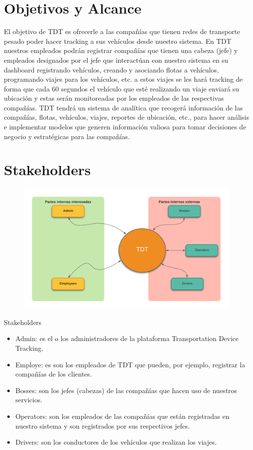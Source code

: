 \documentclass{article}
\begin{document}
\section{Objetivos y Alcance} 
El objetivo de TDT es ofrecerle a las compañías que tienen redes de transporte pesado poder hacer tracking a sus vehículos desde nuestro sistema. En TDT nuestros empleados podrán registrar compañías que tienen una cabeza (jefe) y empleados designados por el jefe que interactúan con nuestro sistema en su dashboard registrando vehículos, creando y asociando flotas a vehículos, programando viajes para los vehículos, etc. a estos viajes se les hará tracking de forma que cada 60 segundos el vehículo que esté realizando un viaje enviará su ubicación y estas serán monitoreadas por los empleados de las respectivas compañías. TDT tendrá un sistema de analítica que recogerá información de las compañías, flotas, vehículos, viajes, reportes de ubicación, etc., para hacer análisis e implementar modelos que generen información valiosa para tomar decisiones de negocio y estratégicas para las compañías.

\newpage
\section{Stakeholders}
\begin{center}
\begin{figure}[h]
    \centering
    \includegraphics[scale=.15]{pics/stakeholders.png}%
    \label{fig:stakeholders}\end{figure}
    \large{Stakeholders}
\end{center}
\begin{itemize}
    \item Admin: es el o los administradores de la plataforma Transportation Device Tracking.
    \item Employe: es son los empleados de TDT que pueden, por ejemplo, registrar la compañías de los clientes.
    \item Bosses: son los jefes (cabezas) de las compañías que hacen uso de nuestros servicios.
    \item Operators: son los empleados de las compañías que están registradas en nuestro sistema y son registrados por sus respectivos jefes.
    \item Drivers: son los conductores de los vehículos que realizan los viajes.
\end{itemize}
\end{document}
